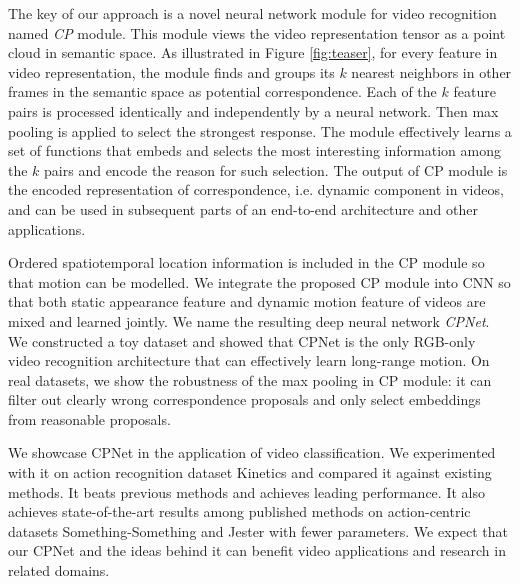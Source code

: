 \documentclass[10pt,twocolumn,letterpaper]{article}
\begin{document}
The key of our approach is a novel neural network module for video recognition named \emph{CP} module. This module views the video representation tensor as a point cloud in semantic space. As illustrated in Figure \ref{fig:teaser}, for every feature in video representation, the module finds and groups its $k$ nearest neighbors in other frames in the semantic space as potential correspondence. Each of the $k$ feature pairs is processed identically and independently by a neural network. Then max pooling is applied to select the strongest response.
  The module effectively learns a set of functions that embeds and selects the most interesting information among the $k$ pairs and encode the reason for such selection. The output of CP module is the encoded representation of correspondence, i.e. dynamic component in videos, and can be used in subsequent parts of an end-to-end architecture and other applications.


Ordered spatiotemporal location information is included in the CP module so that motion can be modelled. We integrate the proposed CP module into CNN so that both static appearance feature and dynamic motion feature of videos are mixed and learned jointly. We name the resulting deep neural network \emph{CPNet}. We constructed a toy dataset and showed that CPNet is the only RGB-only video recognition architecture that can effectively learn long-range motion. On real datasets, we show the robustness of the max pooling in CP module: it can filter out clearly wrong correspondence proposals and only select embeddings from reasonable proposals. 

We showcase CPNet in the application of video classification. We experimented with it on action recognition dataset Kinetics \cite{Kinetics} and compared it against existing methods. It beats previous methods and achieves leading performance. It also achieves state-of-the-art results among published methods on action-centric datasets Something-Something \cite{Something:Something} and Jester \cite{Jester} with fewer parameters. 
We expect that our CPNet and the ideas behind it can benefit video applications and research in related domains. 
















 
\end{document}
